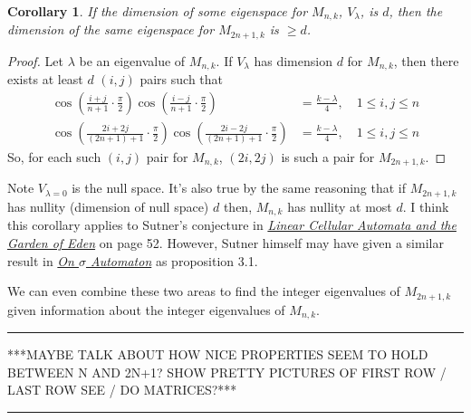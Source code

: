 \documentclass[12pt]{article}
\newtheorem{corollary}{Corollary}
\begin{document}
	\begin{corollary}\label{cor:eigspacedim2n+1}
		If the dimension of some eigenspace for $M_{n,k}$, $V_\lambda$, is $d$, then
		the dimension of the same eigenspace for $M_{2n+1,k}$ is $\geq d$.
	\end{corollary}
	\begin{proof}
		Let $\lambda$ be an eigenvalue of $M_{n,k}$.
		If $V_\lambda$ has dimension $d$ for $M_{n,k}$, then there exists at least $d$
		$(i,j)$ pairs such that
		\begin{align*}
		\cos{\left(\frac{i+j}{n+1}\cdot\frac{\pi}{2}\right)}\cos{\left(\frac{i-j}{n+1}\cdot\frac{\pi}{2}\right)} &= \frac{k-\lambda}{4}, \hspace{12pt} 1 \leq i,j \leq n \\
		\cos{\left(\frac{2i+2j}{(2n+1)+1}\cdot\frac{\pi}{2}\right)}\cos{\left(\frac{2i-2j}{(2n+1)+1}\cdot\frac{\pi}{2}\right)} &= \frac{k-\lambda}{4}, \hspace{12pt} 1 \leq i,j \leq n
		\end{align*}
		So, for each such $(i,j)$ pair for $M_{n,k}$, $(2i,2j)$ is such a pair for
		$M_{2n+1,k}$.
	\end{proof}
	Note $V_{\lambda=0}$ is the null space. 
	It's also true by the same reasoning that if $M_{2n+1,k}$ has nullity
	(dimension of null space) $d$ then, $M_{n,k}$ has nullity at most $d$. 
	I think this corollary applies to Sutner's conjecture in
	\href{https://drive.google.com/open?id=1b7mSpPkASXAFlvrFL6rWC7dB7qN_-VWf}{\textit{Linear
			Cellular Automata and the Garden of Eden}} on page 52. 
	However, Sutner himself may have given a similar result in
	\href{https://drive.google.com/open?id=1ZwW2xNXBOgPMTtV2coq0ODOw0SPFnqSF}{\textit{On
			$\sigma$ Automaton}} as proposition 3.1. 
	
	We can even combine these two areas to find the integer eigenvalues of
	$M_{2n+1,k}$ given information about the integer eigenvalues of $M_{n,k}$.
	
	\hrule
	***MAYBE TALK ABOUT HOW NICE PROPERTIES SEEM TO HOLD BETWEEN N AND 2N+1?
	SHOW PRETTY PICTURES OF FIRST ROW / LAST ROW SEE / DO MATRICES?***
	\hrule
	
\end{document}

